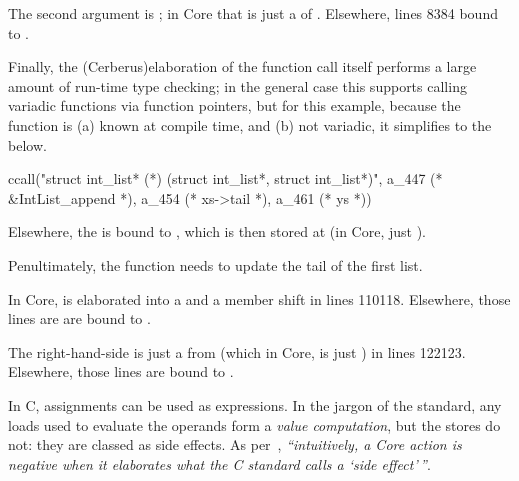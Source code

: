 
The second argument is ; in Core that is just a 
of . Elsewhere, lines 83\textendash{}84 bound to
.


Finally, the \kl(Cerberus){elaboration} of the function call itself performs a large amount of
run-time type checking; in the general case this supports calling variadic
functions via function pointers, but for this example, because the function is
(a) known at compile time, and (b) not variadic, it simplifies to the below.

\begin{corecode}
ccall("struct int_list* (*) (struct int_list*, struct int_list*)",
      a_447 (* &IntList_append *),
      a_454 (* xs->tail *),
      a_461 (* ys *))
\end{corecode}

Elsewhere, the  is bound to ,
which is then stored at  (in Core, just
).


Penultimately, the  function needs to update the tail
of the first list.


In Core,  is elaborated into a 
and a member shift in lines 110\textemdash{}118. Elsewhere, those lines are
are bound to .


The right-hand-side is just a  from 
(which in Core, is just ) in lines 122\textemdash{}123.
Elsewhere, those lines are bound to .


In C, assignments can be used as expressions. In the jargon of the standard,
any loads used to evaluate the operands form a \emph{value computation}, but
the stores do not: they are classed as side effects.\label{sn:side-effect} As
per~\textcite[p61, p66, p99]{memarian2022cerberus}, \emph{``intuitively, a Core action
is negative when it elaborates what the C standard calls a `side
effect'\,''}.


